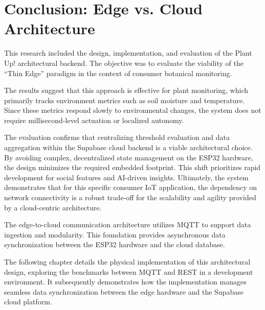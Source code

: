 \newpage
\section{Conclusion: Edge vs. Cloud Architecture}

This research included the design, implementation, and evaluation of the Plant Up! architectural backend. The objective was to evaluate the viability of the ``Thin Edge'' paradigm in the context of consumer botanical monitoring. 

The results suggest that this approach is effective for plant monitoring, which primarily tracks environment metrics such as soil moisture and temperature. Since these metrics respond slowly to environmental changes, the system does not require millisecond-level actuation or localized autonomy. 

The evaluation confirms that centralizing threshold evaluation and data aggregation within the Supabase cloud backend is a viable architectural choice. By avoiding complex, decentralized state management on the ESP32 hardware, the design minimizes the required embedded footprint. This shift prioritizes rapid development for social features and AI-driven insights. Ultimately, the system demonstrates that for this specific consumer IoT application, the dependency on network connectivity is a robust trade-off for the scalability and agility provided by a cloud-centric architecture.

The edge-to-cloud communication architecture utilizes MQTT to support data ingestion and modularity. This foundation provides asynchronous data synchronization between the ESP32 hardware and the cloud database.

The following chapter details the physical implementation of this architectural design, exploring the benchmarks between MQTT and REST in a development environment. It subsequently demonstrates how the implementation manages seamless data synchronization between the edge hardware and the Supabase cloud platform.

